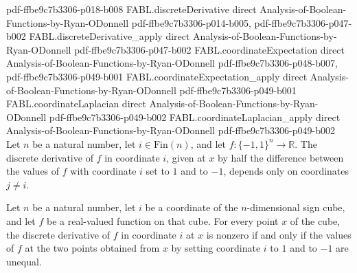 \begin{theorem}
  {pdf-ffbe9c7b3306-p018-b008}
\proofstep
  {FABL.discreteDerivative}
  {direct}
  {Analysis-of-Boolean-Functions-by-Ryan-ODonnell}
  {pdf-ffbe9c7b3306-p014-b005,
    pdf-ffbe9c7b3306-p047-b002}
\proofstep
  {FABL.discreteDerivative_apply}
  {direct}
  {Analysis-of-Boolean-Functions-by-Ryan-ODonnell}
  {pdf-ffbe9c7b3306-p047-b002}
\proofstep
  {FABL.coordinateExpectation}
  {direct}
  {Analysis-of-Boolean-Functions-by-Ryan-ODonnell}
  {pdf-ffbe9c7b3306-p048-b007,
    pdf-ffbe9c7b3306-p049-b001}
\proofstep
  {FABL.coordinateExpectation_apply}
  {direct}
  {Analysis-of-Boolean-Functions-by-Ryan-ODonnell}
  {pdf-ffbe9c7b3306-p049-b001}
\proofstep
  {FABL.coordinateLaplacian}
  {direct}
  {Analysis-of-Boolean-Functions-by-Ryan-ODonnell}
  {pdf-ffbe9c7b3306-p049-b002}
\proofstep
  {FABL.coordinateLaplacian_apply}
  {direct}
  {Analysis-of-Boolean-Functions-by-Ryan-ODonnell}
  {pdf-ffbe9c7b3306-p049-b002}
Let $n$ be a natural number, let $i\in\mathrm{Fin}(n)$, and let $f:\{−1,1\}^n\to\mathbb
R$. The discrete derivative of $f$ in coordinate $i$, given at $x$ by half the
difference between the values of $f$ with coordinate $i$ set to $1$ and to $-1$, depends
only on coordinates $j\ne i$.
\end{theorem}

\begin{theorem}
\label{FABL.discreteDerivative_ne_zero_iff}
\leanok
{}
Let $n$ be a natural number, let $i$ be a coordinate of the $n$-dimensional sign cube,
and let $f$ be a real-valued function on that cube. For every point $x$ of the cube, the
discrete derivative of $f$ in coordinate $i$ at $x$ is nonzero if and only if the values
of $f$ at the two points obtained from $x$ by setting coordinate $i$ to $1$ and to $-1$
are unequal.
\end{theorem}

